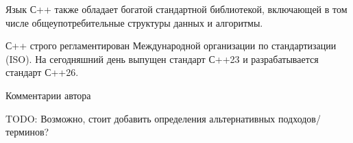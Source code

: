 Язык С++ также обладает богатой стандартной библиотекой, включающей в
том числе общеупотребительные структуры данных и алгоритмы.
    
С++ строго регламентирован Международной организации по стандартизации
(ISO). На сегодняшний день выпущен стандарт С++23 и разрабатывается
стандарт С++26.

Комментарии автора

TODO: Возможно, стоит добавить определения альтернативных
подходов/терминов?
